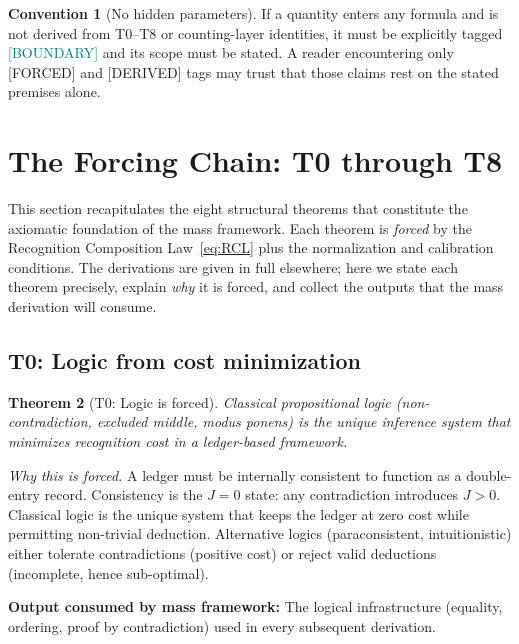 \documentclass[11pt,a4paper]{article}
\newtheorem{theorem}{Theorem}[section]
\theoremstyle{definition}
\newtheorem{convention}[theorem]{Convention}
\theoremstyle{remark}
\newcommand{\Jcost}{J}
\newcommand{\DERIVED}{\textcolor{blue!70!black}{\footnotesize\textsf{[DERIVED]}}}
\newcommand{\FORCED}{\textcolor{red!70!black}{\footnotesize\textsf{[FORCED]}}}
\newcommand{\BOUNDARY}{\textcolor{teal}{\footnotesize\textsf{[BOUNDARY]}}}
\begin{document}
\begin{convention}[No hidden parameters]
\label{conv:no_hidden}
If a quantity enters any formula and is not derived from T0--T8 or
counting-layer identities, it must be explicitly tagged \BOUNDARY{} and its
scope must be stated.  A reader encountering only \FORCED{} and \DERIVED{}
tags may trust that those claims rest on the stated premises alone.
\end{convention}


\section{The Forcing Chain: T0 through T8}
\label{sec:forcing_chain}

This section recapitulates the eight structural theorems that constitute the
axiomatic foundation of the mass framework.  Each theorem is \emph{forced}
by the Recognition Composition Law~\eqref{eq:RCL} plus the normalization and
calibration conditions.  The derivations are given in full elsewhere; here we
state each theorem precisely, explain \emph{why} it is forced, and collect the
outputs that the mass derivation will consume.

\subsection{T0: Logic from cost minimization}

\begin{theorem}[T0: Logic is forced]
\label{thm:T0}
Classical propositional logic (non-contradiction, excluded middle, modus ponens)
is the unique inference system that minimizes recognition cost in a
ledger-based framework.
\end{theorem}

\noindent\textit{Why this is forced.}\quad
A ledger must be internally consistent to function as a double-entry record.
Consistency is the $\Jcost = 0$ state: any contradiction introduces $\Jcost > 0$.
Classical logic is the unique system that keeps the ledger at zero cost while
permitting non-trivial deduction.  Alternative logics (paraconsistent,
intuitionistic) either tolerate contradictions (positive cost) or reject valid
deductions (incomplete, hence sub-optimal).

\medskip
\noindent\textbf{Output consumed by mass framework:}
The logical infrastructure (equality, ordering, proof by contradiction) used
in every subsequent derivation.
\end{document}
